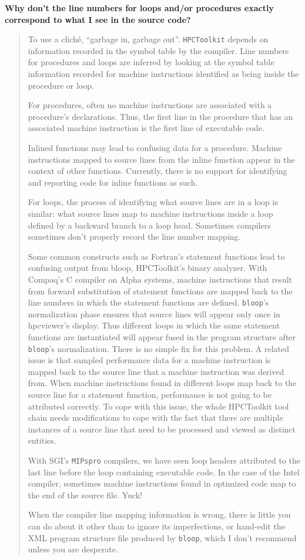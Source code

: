 \documentclass{article}
\begin{document}
\textbf{Why don't the line numbers for loops and/or procedures exactly
correspond to what I see in the source code?}
\begin{quote}

To use a clich\'{e}, ``garbage in, garbage out''. \verb|HPCToolkit|
depends on information recorded in the symbol table by the
compiler. Line numbers for procedures and loops are inferred by
looking at the symbol table information recorded for machine
instructions identified as being inside the procedure or loop.

For procedures, often no machine instructions are associated with a
procedure's declarations. Thus, the first line in the procedure that
has an associated machine instruction is the first line of executable
code.

Inlined functions may lead to confusing data for a procedure. Machine
instructions mapped to source lines from the inline function appear in
the context of other functions. Currently, there is no support for
identifying and reporting code for inline functions as such.

For loops, the process of identifying what source lines are in a loop
is similar: what source lines map to machine instructions inside a
loop defined by a backward branch to a loop head. Sometimes compilers
sometimes don’t properly record the line number mapping.

Some common constructs such as Fortran's statement functions lead to
confusing output from bloop, HPCToolkit’s binary analyzer. With
Compaq's C compiler on Alpha systems, machine instructions that result
from forward substitution of statement functions are mapped back to
the line numbers in which the statement functions are defined. \verb|bloop|'s
normalization phase ensures that source lines will appear only once in
hpcviewer’s display. Thus different loops in which the same statement
functions are instantiated will appear fused in the program structure
after \verb|bloop|'s normalization. There is no simple fix for this
problem. A related issue is that sampled performance data for a
machine instruction is mapped back to the source line that a machine
instruction was derived from.  When machine instructions found in
different loops map back to the source line for a statement function,
performance is not going to be attributed correctly. To cope with this
issue, the whole HPCToolkit tool chain needs modifications to cope
with the fact that there are multiple instances of a source line that
need to be processed and viewed as distinct entities.

With SGI's \verb|MIPspro| compilers, we have seen loop headers attributed to
the last line before the loop containing executable code. In the case
of the Intel compiler, sometimes machine instructions found in
optimized code map to the end of the source file. Yuck!

When the compiler line mapping information is wrong, there is little
you can do about it other than to ignore its imperfections, or
hand-edit the XML program structure file produced by \verb|bloop|, which I
don’t recommend unless you are desperate.
\end{quote}
\end{document}
